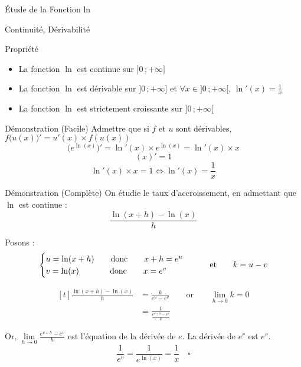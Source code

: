 \documentclass{cours}
\begin{document}
    \begin{Gpartie}{Étude de la Fonction ln}
        \begin{Spartie}{Continuité, Dérivabilité}
            \begin{SSpartie}{Propriété}
                \begin{itemize}
                    \item La fonction $\ln$ est continue sur $\big]0\,;+\infty\big]$
                    \item La fonction $\ln$ est dérivable sur $\big]0\,;+\infty\big]$ et $\forall x\in\big]0\,;+\infty\big[$, $\ln'(x)=\frac{1}{x}$
                    \item La fonction $\ln$ est strictement croissante sur $\big]0\,;+\infty\big[$
                \end{itemize}
                \begin{SSSpartie}{Démonstration (Facile)}
                    Admettre que si $f$ et $u$ sont dérivables, $f\big(u(x)\big)'=u'(x)\times f(u(x))$
                    \[\big(e^{\ln(x)}\big)'=\ln'(x)\times e^{\ln(x)}=\ln'(x)\times x\]
                    \[(x)'=1\]
                    \[\ln'(x)\times x=1\iff\ln'(x)=\frac{1}{x}\]
                    
                \end{SSSpartie}
                \begin{SSSpartie}{Démonstration (Complète)} 
                    On étudie le taux d'accroissement, en admettant que $\ln$ est continue :
                    \[\frac{\ln(x+h)-\ln(x)}{h}\]

                    Posons :
                    \[\begin{cases}
                        u=\ln(x+h)\qquad\text{donc}\qquad x+h=e^u \\ v=\ln(x)\phantom{+h)}\text{\qquad donc\qquad} x=e^v
                    \end{cases}\qquad\text{et}\qquad k=u-v\]

                    \[\begin{aligned}[t]
                        \frac{\ln(x+h)-\ln(x)}{h}&=\frac{k}{e^u-e^v}\qquad\text{or}\qquad\lim_{h\to0}k=0 \\
                        &=\frac{1}{\frac{e^{v+h}-e^v}{k}}
                    \end{aligned}\]

                    Or, $\lim\limits_{h\to0}\frac{e^{v+h}-e^v}{h}$ est l'équation de la dérivée de $e$. La dérivée de $e^v$ est $e^v$.
                    \[\frac{1}{e^v}=\frac{1}{e^{\ln(x)}}=\frac{1}{x}\quad\square\]


\end{SSSpartie}
\end{SSpartie}
\end{Spartie}
\end{Gpartie}
\end{document}
